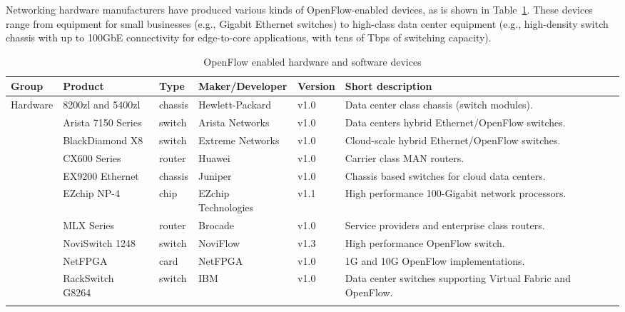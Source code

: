 Networking hardware manufacturers have produced various kinds of OpenFlow-enabled devices, as is shown in Table~\ref{tab:openflowdevices}. 
These devices range from equipment for small businesses (e.g., Gigabit Ethernet switches) to high-class data center equipment (e.g., high-density switch chassis with up to 100GbE connectivity for edge-to-core applications, with tens of Tbps of switching capacity).

{\renewcommand{\arraystretch}{1.4}
\begin{table}[!htp]
\caption{OpenFlow enabled hardware and software devices}
\label{tab:openflowdevices}
\begin{center}
\footnotesize
\begin{tabularx}{\linewidth}{p{1.2cm}p{3.1cm}p{0.9cm}p{2.4cm}p{0.8cm}X}
\hline
\textbf{Group} & \textbf{Product} & \textbf{Type} & \textbf{Maker/Developer} & \textbf{Version} & \textbf{Short description} \\
\hline
\multirow{16}{*}{Hardware} 
& 8200zl and 5400zl~\cite{hp2013} & chassis & Hewlett-Packard & v1.0 & Data center class chassis (switch modules). \\\cline{2-6}
& Arista 7150 Series~\cite{aristanetworks2013} & switch & Arista Networks & v1.0 & Data centers hybrid Ethernet/OpenFlow switches. \\\cline{2-6}
& BlackDiamond X8~\cite{extremenetworks2013} & switch & Extreme Networks & v1.0 & Cloud-scale  hybrid Ethernet/OpenFlow switches. \\\cline{2-6}
& CX600 Series~\cite{co.2013} & router & Huawei & v1.0 & Carrier class MAN routers. \\\cline{2-6}
& EX9200 Ethernet~\cite{junipernetworks2013} & chassis & Juniper & v1.0 & Chassis based switches for cloud data centers. \\\cline{2-6}
& EZchip NP-4~\cite{yokneam2011} & chip & EZchip Technologies & v1.1 & High performance 100-Gigabit network processors. \\\cline{2-6}
& MLX Series~\cite{brocade2013} & router & Brocade & v1.0 & Service providers and enterprise class routers. \\\cline{2-6}
& NoviSwitch 1248~\cite{noviflow2013-1} & switch & NoviFlow & v1.3& High performance OpenFlow switch. \\\cline{2-6}
& NetFPGA~\cite{netfpga2014} & card & NetFPGA & v1.0 & 1G and 10G OpenFlow implementations. \\\cline{2-6}
& RackSwitch G8264~\cite{ibm2013} & switch & IBM & v1.0 & Data center switches supporting Virtual Fabric and OpenFlow. \\\cline{2-6}

\end{tabularx}
\end{center}
\end{table}}
